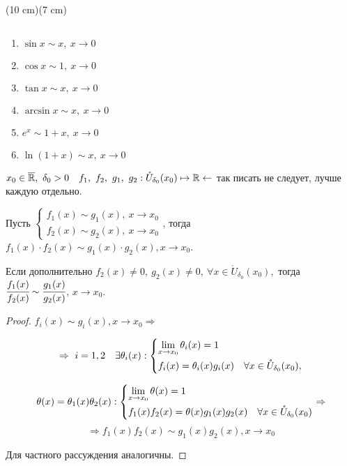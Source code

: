 \sidefig(10 cm)(7 cm)
{
\begin{flushleft}

\end{flushleft}
}
{
\begin{examples} $\ $
\begin{enumerate}
    \item $\sin x \sim x, \ x\to 0$
    \item $\cos x \sim 1,\ x\to 0$
    \item $\tan x \sim x,\ x \to 0$
    \item $\arcsin x \sim x,\ x \to 0$
    \item $e^{x} \sim 1+x,\ x\to 0$
    \item $\ln(1+x) \sim x,\ x\to 0$
\end{enumerate}
\end{examples}
}
    


\begin{lemma}
    $x_{0} \in \overline{\mathbb{R}}, \ \delta_{0} > 0 \quad f_{1},\ f_{2},\ g_{1},\ g_{2}: \mathring{U}_{\delta_{0}}(x_{0}) \mapsto \mathbb{R} \leftarrow$ так писать не следует, лучше каждую отдельно.

    Пусть $\left\{
    \begin{gathered}
        f_{1}(x) \sim g_{1}(x),\  x\to x_{0} \\
        f_{2}(x) \sim g_{2}(x),\  x\to x_{0}
    \end{gathered} \right.$, тогда $f_{1}(x) \cdot f_{2} (x) \sim g_{1}(x) \cdot g_{2} (x), x\to x_{0}$.

    Если дополнительно $f_{2}(x) \neq 0,\  g_{2}(x) \neq 0, \ \forall x\in \mathring{U}_{\delta_{0}}(x_{0}),$ тогда $\cfrac{f_{1}(x)}{f_{2}(x)} \sim \cfrac{g_{1}(x)}{g_{2}(x)}$, $x\to x_{0}$.
\end{lemma}
\begin{proof}
    $f_{i}(x) \sim g_{i}(x), x\to x_{0} \Rightarrow $
    
    $$
    \Rightarrow \ i =1,2\quad  \exists \theta_{i}(x): \left\{
    \begin{gathered}
        \lim\limits_{x\to x_{0}} \theta_{i}(x) = 1 \hfill \\
        f_{i}(x) = \theta_{i}(x) g_{i}(x) \quad \forall x\in \mathring{U}_{\delta_{0}}(x_{0}), 
    \end{gathered} \right.$$

    $$
    \theta(x) = \theta_{1}(x)\theta_{2}(x): 
    \left\{ \begin{gathered}
        \lim\limits_{x \to x_{0}} \theta(x)= 1 \hfill \\
        f_{1}(x)f_{2}(x) = \theta(x) g_{1}(x)g_{2}(x) \quad \forall x\in \mathring{U}_{\delta_{0}}(x_{0})\hfill
        \end{gathered} \right.
        \Rightarrow
    $$
    $$
    \Rightarrow
        f_{1}(x)f_{2}(x)\sim g_{1}(x)g_{2}(x), x\to x_{0}
    $$

    Для частного рассуждения аналогичны.
\end{proof}

